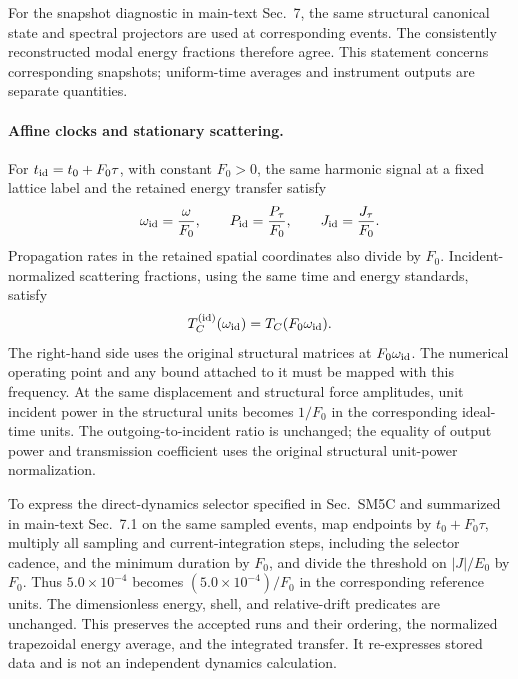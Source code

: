 \documentclass[10pt,aps,onecolumn,notitlepage,nofootinbib]{revtex4-2}
\begin{document}
For the snapshot diagnostic in main-text Sec.~7, the same structural canonical state and spectral projectors are used at corresponding events. The consistently reconstructed modal energy fractions therefore agree. This statement concerns corresponding snapshots; uniform-time averages and instrument outputs are separate quantities.

\paragraph*{Affine clocks and stationary scattering.}
For $t_{\rm id}=t_0+F_0\tau$, with constant $F_0>0$, the same harmonic signal at a fixed lattice label and the retained energy transfer satisfy
\[
 \omega_{\rm id}=\frac{\omega}{F_0},\qquad
 P_{\rm id}=\frac{P_\tau}{F_0},\qquad
 J_{\rm id}=\frac{J_\tau}{F_0}.
\]
Propagation rates in the retained spatial coordinates also divide by $F_0$. Incident-normalized scattering fractions, using the same time and energy standards, satisfy
\[
 T_C^{({\rm id})}(\omega_{\rm id})=T_C(F_0\omega_{\rm id}).
\]
The right-hand side uses the original structural matrices at $F_0\omega_{\rm id}$. The numerical operating point and any bound attached to it must be mapped with this frequency. At the same displacement and structural force amplitudes, unit incident power in the structural units becomes $1/F_0$ in the corresponding ideal-time units. The outgoing-to-incident ratio is unchanged; the equality of output power and transmission coefficient uses the original structural unit-power normalization.

To express the direct-dynamics selector specified in Sec.~SM5C and summarized in main-text Sec.~7.1 on the same sampled events, map endpoints by $t_0+F_0\tau$, multiply all sampling and current-integration steps, including the selector cadence, and the minimum duration by $F_0$, and divide the threshold on $|J|/E_0$ by $F_0$. Thus $5.0\times10^{-4}$ becomes $(5.0\times10^{-4})/F_0$ in the corresponding reference units. The dimensionless energy, shell, and relative-drift predicates are unchanged. This preserves the accepted runs and their ordering, the normalized trapezoidal energy average, and the integrated transfer. It re-expresses stored data and is not an independent dynamics calculation.
\end{document}
